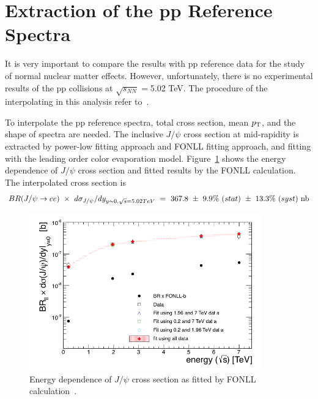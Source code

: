 \clearpage

\section{Extraction of the pp Reference Spectra}
\label{sec_4_ppref}
It is very important to compare the results with pp reference data for the study of normal nuclear matter effects. 
However, unfortunately, there is no experimental results of the pp collisions at $\sqrt{s_{NN}} =$5.02 TeV.
The procedure of the interpolating in this analysis refer to~\cite{bib_jpsippref}.

To interpolate the pp reference spectra, total cross section, mean $p_{\rm{T}}$, and the shape of spectra are needed. 
The inclusive $J/\psi$ cross section at mid-rapidity is extracted by power-low fitting approach and FONLL fitting approach, and fitting with the leading order color evaporation model.  
Figure~\ref{fig_4_ppsigmafit} shows the energy dependence of $J/\psi$ cross section and fitted results by the FONLL calculation. 
The interpolated cross section is
\begin{equation}
  BR(J/\psi\rightarrow ee)~\times ~d\sigma_{J/\psi}/dy_{y\sim0, \sqrt{s}=5.02TeV}~=~367.8~\pm~9.9\%~(stat)~\pm~ 13.3\% ~(syst) ~\rm{nb}
\end{equation}  
\begin{figure}[!h]
  \centering
  \includegraphics[width=10cm]{chap4/figure/ppref/sigmafitfonll.png}
  \caption{
  	Energy dependence of $J/\psi$ cross section as fitted by FONLL calculation~\cite{bib_jpsippref}. 
  }
  \label{fig_4_ppsigmafit}
\end{figure}

